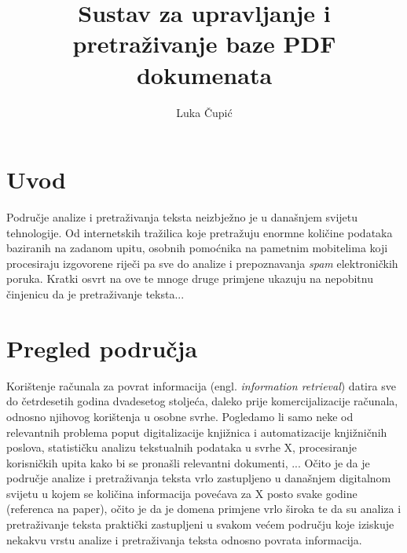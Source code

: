 \documentclass[times, utf8, zavrsni]{fer}
\begin{document}

\title{Sustav za upravljanje i pretraživanje baze PDF dokumenata}

\author{Luka Čupić}

\maketitle

\izvornik

\zahvala{}

\tableofcontents

\chapter{Uvod}
Područje analize i pretraživanja teksta neizbježno je u današnjem svijetu tehnologije. Od internetskih tražilica koje pretražuju enormne količine podataka baziranih na zadanom upitu, osobnih pomoćnika na pametnim mobitelima koji procesiraju izgovorene riječi pa sve do analize i prepoznavanja \textit{spam} elektroničkih poruka.
Kratki osvrt na ove te mnoge druge primjene ukazuju na nepobitnu činjenicu da je pretraživanje teksta...

\chapter{Pregled područja}
Korištenje računala za povrat informacija (engl. \textit{information retrieval}) datira sve do četrdesetih godina dvadesetog stoljeća, daleko prije komercijalizacije računala, odnosno njihovog korištenja u osobne svrhe. Pogledamo li samo neke od relevantnih problema poput digitalizacije knjižnica i automatizacije knjižničnih poslova, statističku analizu tekstualnih podataka u svrhe X, procesiranje korisničkih upita kako bi se pronašli relevantni dokumenti, ... Očito je da je područje analize i pretraživanja teksta vrlo zastupljeno u današnjem digitalnom svijetu u kojem se količina informacija povećava za X posto svake godine (referenca na paper), očito je da je domena primjene vrlo široka te da su analiza i pretraživanje teksta praktički zastupljeni u svakom većem području koje iziskuje nekakvu vrstu analize i pretraživanja teksta odnosno povrata informacija.
\end{document}
